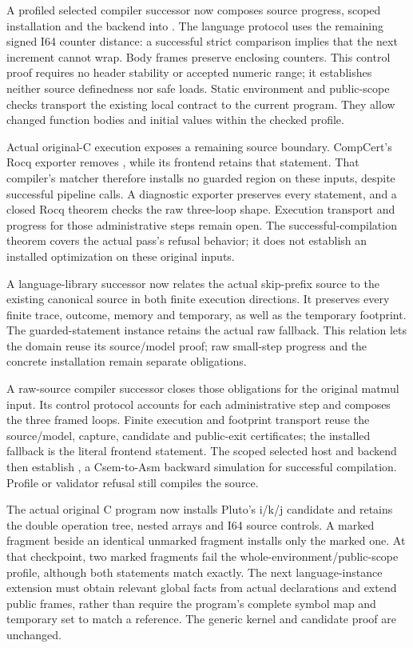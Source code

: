 A profiled selected compiler successor now composes source progress, scoped
installation and the backend into .
The language protocol uses the remaining signed I64 counter distance: a
successful strict comparison implies that the next increment cannot wrap.
Body frames preserve enclosing counters. This control proof requires no header
stability or accepted numeric range; it establishes neither source definedness
nor safe loads. Static environment and public-scope checks transport the
existing local contract to the current program. They allow changed function
bodies and initial values within the checked profile.

Actual original-C execution exposes a remaining source boundary. CompCert's
Rocq exporter removes , while its frontend retains that
statement. That compiler's matcher therefore installs no guarded region on these
inputs, despite successful pipeline calls. A diagnostic exporter preserves
every statement, and a closed Rocq theorem checks the raw three-loop shape.
Execution transport and progress for those administrative steps remain open.
The successful-compilation theorem covers the actual pass's refusal behavior;
it does not establish an installed optimization on these original inputs.

A language-library successor now relates the actual skip-prefix source to the
existing canonical source in both finite execution directions. It preserves
every finite trace, outcome, memory and temporary, as well as the temporary
footprint. The guarded-statement instance retains the actual raw fallback.
This relation lets the domain reuse its source/model proof; raw small-step
progress and the concrete installation remain separate obligations.

A raw-source compiler successor closes those obligations for the original
matmul input. Its control protocol accounts for each administrative step and
composes the three framed loops. Finite execution and footprint transport reuse
the source/model, capture, candidate and public-exit certificates; the installed
fallback is the literal frontend statement. The scoped selected host and backend
then establish , a
Csem-to-Asm backward simulation for successful compilation. Profile or validator
refusal still compiles the source.

The actual original C program now installs Pluto's i/k/j candidate and retains
the double operation tree, nested arrays and I64 source controls. A marked
fragment beside an identical unmarked fragment installs only the marked one.
At that checkpoint, two marked fragments fail the whole-environment/public-scope profile,
although both statements match exactly. The next language-instance extension
must obtain relevant global facts from actual declarations and extend public
frames, rather than require the program's complete symbol map and temporary
set to match a reference. The generic kernel and candidate proof are unchanged.

